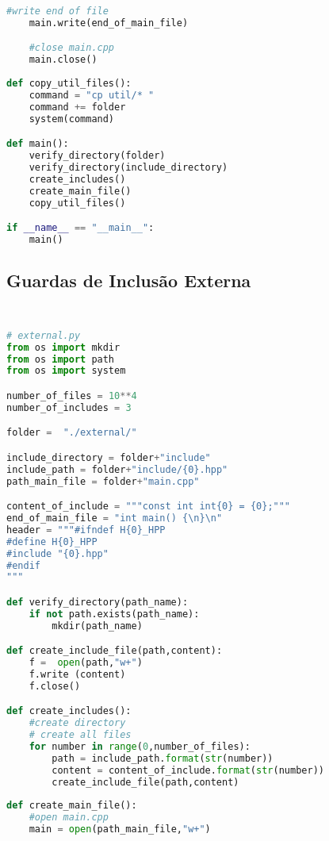 \begin{apendicesenv}
\begin{lstlisting}[language=Python, caption={
     Script Guardas de Inclusão Externa mais pragma once},
                  label=script_external_pragma_include]
    #write end of file
    main.write(end_of_main_file)

    #close main.cpp
    main.close()
                                                                                  
def copy_util_files():                                                           
    command = "cp util/* "                                                       
    command += folder                                                            
    system(command)      

def main():
    verify_directory(folder)
    verify_directory(include_directory)
    create_includes()
    create_main_file()
    copy_util_files()

if __name__ == "__main__":
    main()
\end{lstlisting}

\subsection{Guardas de Inclusão Externa}
\begin{lstlisting}[language=Python,caption={
            Script Guardas de Inclusão Externa },
                   label=script_external_include]
                   
                   
# external.py
from os import mkdir
from os import path
from os import system

number_of_files = 10**4
number_of_includes = 3

folder =  "./external/"

include_directory = folder+"include"
include_path = folder+"include/{0}.hpp"
path_main_file = folder+"main.cpp"

content_of_include = """const int int{0} = {0};"""
end_of_main_file = "int main() {\n}\n"
header = """#ifndef H{0}_HPP
#define H{0}_HPP
#include "{0}.hpp"
#endif
"""

def verify_directory(path_name):
    if not path.exists(path_name):
        mkdir(path_name)

def create_include_file(path,content):
    f =  open(path,"w+")
    f.write (content)
    f.close()

def create_includes():
    #create directory
    # create all files
    for number in range(0,number_of_files):
        path = include_path.format(str(number))
        content = content_of_include.format(str(number))
        create_include_file(path,content)
    
def create_main_file():
    #open main.cpp
    main = open(path_main_file,"w+")


\end{lstlisting}
\end{apendicesenv}
